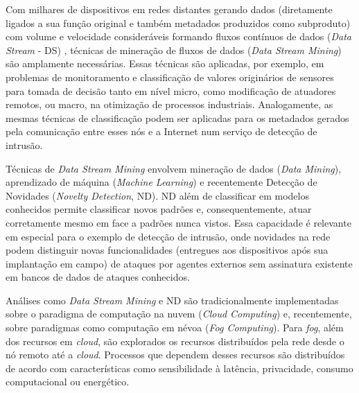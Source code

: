 
Com milhares de dispositivos em redes distantes gerando dados (diretamente
ligados a sua função original e também metadados produzidos como subproduto) com
volume e velocidade consideráveis formando fluxos contínuos de dados (\emph{Data
Stream} - DS) , técnicas de mineração de fluxos de dados
(\emph{Data Stream Mining}) são amplamente necessárias.
Essas técnicas são
aplicadas, por exemplo, em problemas de monitoramento e classificação de valores
originários de sensores para tomada de decisão tanto em nível micro, como
modificação de atuadores remotos, ou macro, na otimização de processos
industriais.
Analogamente, as mesmas técnicas de classificação podem ser aplicadas para os
metadados gerados pela comunicação entre esses nós e a Internet num serviço de
detecção de intrusão.

\newcommand{\nd}{ND\xspace}

Técnicas de \emph{Data Stream Mining} envolvem mineração de dados
(\emph{Data Mining}), aprendizado de
máquina (\emph{Machine Learning}) e recentemente Detecção de Novidades
(\emph{Novelty Detection}, \nd).
ND além de classificar em modelos conhecidos
permite classificar novos padrões e, consequentemente, atuar corretamente mesmo
em face a padrões nunca vistos.
Essa capacidade é relevante em especial para o
exemplo de detecção de intrusão, onde novidades na rede podem distinguir novas
funcionalidades (entregues aos dispositivos após sua implantação em campo) de
ataques por agentes externos sem assinatura existente em bancos de
dados de ataques conhecidos.


Análises como \emph{Data Stream Mining} e ND são tradicionalmente implementadas
sobre o paradigma de computação na nuvem
(\emph{Cloud Computing}) e, recentemente, sobre paradigmas como computação em névoa
(\emph{Fog Computing}). Para \emph{fog}, além dos recursos em \emph{cloud}, são
explorados os recursos distribuídos pela rede desde o nó remoto até a
\emph{cloud}. Processos que dependem desses recursos são distribuídos de acordo
com características como sensibilidade à latência, privacidade,
consumo computacional ou energético.

